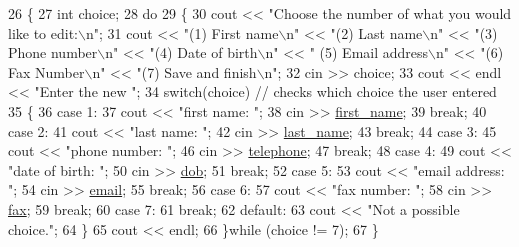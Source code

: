 \begin{DoxyCode}
26 \{
27    \textcolor{keywordtype}{int} choice;
28    \textcolor{keywordflow}{do}
29    \{
30       cout << \textcolor{stringliteral}{"Choose the number of what you would like to edit:\(\backslash\)n"};
31       cout << \textcolor{stringliteral}{"(1) First name\(\backslash\)n"} << \textcolor{stringliteral}{"(2) Last name\(\backslash\)n"} << \textcolor{stringliteral}{"(3) Phone number\(\backslash\)n"} << \textcolor{stringliteral}{"(4) Date of birth\(\backslash\)n"} << \textcolor{stringliteral}{"
      (5) Email address\(\backslash\)n"} << \textcolor{stringliteral}{"(6) Fax Number\(\backslash\)n"} << \textcolor{stringliteral}{"(7) Save and finish\(\backslash\)n"};
32       cin >> choice;
33       cout << endl << \textcolor{stringliteral}{"Enter the new "};
34       \textcolor{keywordflow}{switch}(choice) \textcolor{comment}{// checks which choice the user entered                                               
                                                                                                       }
35       \{
36          \textcolor{keywordflow}{case} 1:
37             cout << \textcolor{stringliteral}{"first name: "};
38             cin >> \hyperlink{classContact_ac074ba210aa0e4a52921af8353384a59}{first\_name};
39             \textcolor{keywordflow}{break};
40          \textcolor{keywordflow}{case} 2:
41             cout << \textcolor{stringliteral}{"last name: "};
42             cin >> \hyperlink{classContact_a87032ae00ab0e8cc81d660f191bcf0fa}{last\_name};
43             \textcolor{keywordflow}{break};
44          \textcolor{keywordflow}{case} 3:
45             cout << \textcolor{stringliteral}{"phone number: "};
46             cin >> \hyperlink{classContact_ad23a96ecf0527e8878da50da682ba794}{telephone};
47             \textcolor{keywordflow}{break};
48          \textcolor{keywordflow}{case} 4:
49             cout << \textcolor{stringliteral}{"date of birth: "};
50             cin >> \hyperlink{classContact_a50397132da5dc66f2cb289fc650c3df6}{dob};
51             \textcolor{keywordflow}{break};
52          \textcolor{keywordflow}{case} 5:
53             cout << \textcolor{stringliteral}{"email address: "};
54             cin >> \hyperlink{classContact_a7cb8a0ab45d0ddc7a83df39590fcb6c1}{email};
55             \textcolor{keywordflow}{break};
56          \textcolor{keywordflow}{case} 6:
57             cout << \textcolor{stringliteral}{"fax number: "};
58             cin >> \hyperlink{classBusinessContact_aacd4a6593b7bfdb066ad53af1a6ec94f}{fax};
59             \textcolor{keywordflow}{break};
60          \textcolor{keywordflow}{case} 7:
61             \textcolor{keywordflow}{break};
62          \textcolor{keywordflow}{default}:
63             cout << \textcolor{stringliteral}{"Not a possible choice."};
64       \}
65       cout << endl;
66    \}\textcolor{keywordflow}{while} (choice != 7);
67 \}
\end{DoxyCode}
